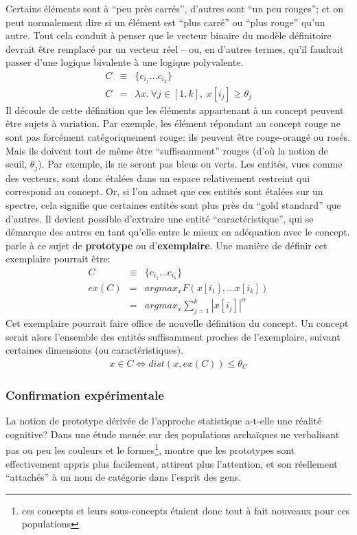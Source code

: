 \documentclass[french]{article}
\begin{document}
				Certains éléments sont à ``peu près carrés'', d'autres sont ``un peu rouges''; et on peut normalement dire si un élément est ``plus carré'' ou ``plus rouge'' qu'un autre. Tout cela conduit à penser que le vecteur binaire du modèle définitoire devrait être remplacé par un vecteur réel -- ou, en d'autres termes, qu'il faudrait passer d'une logique bivalente à une logique polyvalente.
				\begin{eqnarray*}
				C &\equiv&  \lbrace c_{i_1} \dots c_{i_k} \rbrace \\
				C &=& \lambda x. \ \forall j \in [1, k], \ x[i_j] \geq \theta_j
				\end{eqnarray*}
				Il découle de cette définition que les éléments appartenant à un concept peuvent être sujets à variation. Par exemple, les élément répondant au concept rouge ne sont pas forcément catégoriquement rouge: ils peuvent être rouge-orangé ou rosés. Mais ils doivent tout de même être ``suffisamment'' rouges (d'où la notion de seuil, $\theta_j$). Par exemple, ils ne seront pas bleus ou verts. Les entités, vues comme des vecteurs, sont donc étalées dans un espace relativement restreint qui correspond au concept. Or, si l'on admet que ces entités sont étalées sur un spectre, cela signifie que certaines entités sont plus près du ``gold standard'' que d'autres. Il devient possible d'extraire une entité ``caractéristique'', qui se démarque des autres en tant qu'elle entre le mieux en adéquation avec le concept. \cite{rosch1973} parle à ce sujet de \textbf{prototype} ou d'\textbf{exemplaire}. Une manière de définir cet exemplaire pourrait être:
				\begin{eqnarray*}
				C &\equiv&  \lbrace c_{i_1} \dots c_{i_k} \rbrace \\
				ex(C) &=& argmax_x F(x[i_1], \dots x[i_k]) \\
				&=& argmax_x \sum_{j = 1}^{k}|x[i_j]|^\alpha
				\end{eqnarray*}
				Cet exemplaire pourrait faire office de nouvelle définition du concept. Un concept serait alors l'ensemble des entités suffisamment proches de l'exemplaire, suivant certaines dimensions (ou caractéristiques).
				\begin{eqnarray*}
				x \in C \iff dist(x, ex(C)) \leq \theta_C
				\end{eqnarray*}
				\subsubsection{Confirmation expérimentale}
					La notion de prototype dérivée de l'approche statistique a-t-elle une réalité cognitive? Dans une étude menée sur des populations archaïques ne verbalisant pas ou peu les couleurs et le formes\footnote{ces concepts et leurs sous-concepts étaient donc tout à fait nouveaux pour ces populations}, \cite{rosch1973} montre que les prototypes sont effectivement appris plus facilement, attirent plus l'attention, et son réellement ``attachés'' à un nom de catégorie dans l'esprit des gens.\\
					
\end{document}
